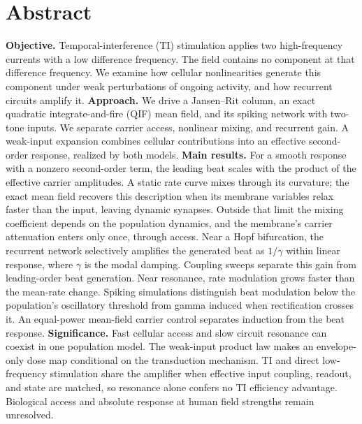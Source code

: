\documentclass[11pt,a4paper]{article}
\newif\ifjne
\begin{document}
\section*{Abstract}
\ifjne
\noindent
\textbf{Objective.} Temporal-interference (TI) stimulation applies two high-frequency
currents with a low difference frequency. The field contains no component at that
difference frequency. We examine how cellular nonlinearities generate this component
under weak perturbations of ongoing activity, and how recurrent circuits amplify it.
\textbf{Approach.} We drive a Jansen--Rit column, an exact quadratic integrate-and-fire
(QIF) mean field, and its spiking network with two-tone inputs. We separate carrier
access, nonlinear mixing, and recurrent gain. A weak-input expansion combines cellular
contributions into an effective second-order response, realized by both models.
\textbf{Main results.} For a smooth response with a nonzero second-order term, the
leading beat scales with the product of the effective carrier amplitudes.
A static rate curve mixes through its curvature;
the exact mean field recovers this description when its membrane variables relax faster
than the input, leaving dynamic synapses. Outside that limit the mixing coefficient
depends on the population dynamics, and the membrane's carrier attenuation enters
only once, through access. Near a Hopf
bifurcation, the recurrent network selectively amplifies the generated beat as
$1/\gamma$ within linear response, where $\gamma$ is the modal damping. Coupling sweeps
separate this gain from leading-order beat generation. Near resonance, rate modulation
grows faster than the mean-rate change. Spiking simulations distinguish beat modulation
below the population's oscillatory threshold from gamma induced when rectification
crosses it. An equal-power mean-field carrier control separates induction from the beat response.
\textbf{Significance.} Fast cellular access and slow circuit resonance can coexist in
one population model. The weak-input product law makes an envelope-only dose map
conditional on the transduction mechanism. TI and direct low-frequency stimulation
share the amplifier when effective input coupling, readout, and state are matched, so
resonance alone confers no TI efficiency advantage. Biological access and absolute
response at human field strengths remain unresolved.
\end{document}
